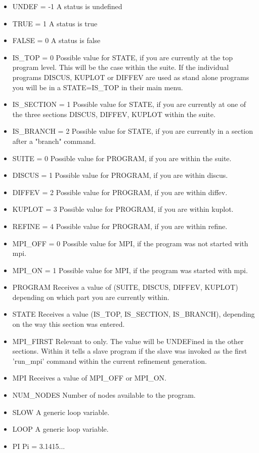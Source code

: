 \begin{itemize}
  \item UNDEF = -1  A status is undefined
  \item TRUE  = 1   A status is true
  \item FALSE = 0   A status is false
  \item IS\_TOP = 0 Possible value for STATE, if you are currently at the
                    top program level. This will be the case within the
                    suite. If the individual programs DISCUS, KUPLOT
                    or DIFFEV are used as stand alone programs you will 
                    be in a STATE=IS\_TOP in their main menu.
  \item IS\_SECTION = 1  Possible value for STATE, if you are currently at
                    one of the three sections DISCUS, DIFFEV, KUPLOT
                    within the suite.
  \item IS\_BRANCH = 2  Possible value for STATE, if you are currently in
                    a section after a "branch" command. 
  \item SUITE = 0   Possible value for PROGRAM, if you are within the suite.
  \item DISCUS = 1   Possible value for PROGRAM, if you are within discus.
  \item DIFFEV = 2   Possible value for PROGRAM, if you are within diffev.
  \item KUPLOT = 3   Possible value for PROGRAM, if you are within kuplot.
  \item REFINE = 4   Possible value for PROGRAM, if you are within refine.
  \item MPI\_OFF = 0 Possible value for MPI, if the program was not started
                     with mpi.
  \item MPI\_ON  = 1 Possible value for MPI, if the program was started
                     with mpi.
  \item PROGRAM      Receives a value of (SUITE, DISCUS, DIFFEV, KUPLOT)
                     depending on which part you are currently within.
  \item STATE        Receives a value (IS\_TOP, IS\_SECTION, IS\_BRANCH),
                     depending on the way this section was entered.
  \item MPI\_FIRST   Relevant to \Diffev only. The value will be UNDEFined
                     in the other sections. Within \Diffev it tells a 
                     slave program if the slave was invoked as the first
                     'run\_mpi' command within the current refinement generation.
  \item MPI          Receives a value of MPI\_OFF or MPI\_ON. 
  \item NUM\_NODES   Number of nodes available to the program. 
  \item SLOW         A generic loop variable.
  \item LOOP         A generic loop variable.
  \item PI           Pi = 3.1415... 
\end{itemize}  

